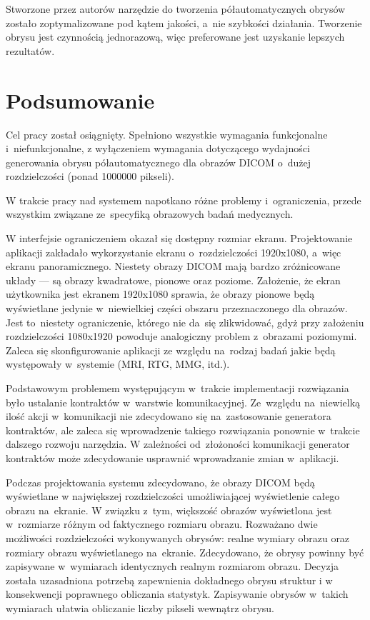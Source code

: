 \documentclass[a4paper,11pt,twoside,openright]{report}
\newcommand\blankpage{%
    \null
    \thispagestyle{empty}%
    \newpage}
\theoremstyle{definition}
\begin{document}
Stworzone przez autorów narzędzie do tworzenia półautomatycznych obrysów zostało zoptymalizowane
pod kątem jakości, a~nie szybkości działania. Tworzenie obrysu jest czynnością jednorazową, więc
preferowane jest uzyskanie lepszych rezultatów.

\afterpage{\blankpage}
\chapter {Podsumowanie}


Cel pracy został osiągnięty. Spełniono wszystkie wymagania funkcjonalne i~niefunkcjonalne,
z wyłączeniem wymagania dotyczącego wydajności generowania obrysu półautomatycznego
dla obrazów DICOM o~dużej rozdzielczości (ponad 1000000 pikseli).

W trakcie pracy nad systemem napotkano różne problemy i~ograniczenia, przede wszystkim
związane ze~specyfiką obrazowych badań medycznych.

W interfejsie ograniczeniem okazał się dostępny rozmiar ekranu. Projektowanie
aplikacji zakładało wykorzystanie ekranu o~rozdzielczości 1920x1080, a~więc ekranu
panoramicznego. Niestety obrazy DICOM mają bardzo zróżnicowane układy --- są obrazy
kwadratowe, pionowe oraz poziome. Założenie, że ekran użytkownika jest ekranem
1920x1080 sprawia, że obrazy pionowe będą wyświetlane jedynie w~niewielkiej
części obszaru przeznaczonego dla obrazów. Jest to~niestety ograniczenie, którego
nie da~się zlikwidować, gdyż przy założeniu rozdzielczości 1080x1920 powoduje
analogiczny problem z~obrazami poziomymi. Zaleca się skonfigurowanie aplikacji
ze względu na~rodzaj badań jakie będą występowały w~systemie (MRI, RTG, MMG, itd.).


Podstawowym problemem występującym w~trakcie implementacji rozwiązania było
ustalanie kontraktów w~warstwie komunikacyjnej. Ze~względu na~niewielką ilość
akcji w~komunikacji nie zdecydowano się na~zastosowanie generatora kontraktów,
ale zaleca się wprowadzenie takiego rozwiązania ponownie w~trakcie dalszego rozwoju narzędzia.
W zależności od~złożoności komunikacji generator kontraktów może zdecydowanie
usprawnić wprowadzanie zmian w~aplikacji.

Podczas projektowania systemu zdecydowano, że obrazy DICOM będą wyświetlane w
największej rozdzielczości umożliwiającej wyświetlenie całego obrazu na~ekranie.
W związku z~tym, większość obrazów wyświetlona jest w~rozmiarze różnym od
faktycznego rozmiaru obrazu. Rozważano dwie możliwości rozdzielczości wykonywanych
obrysów: realne wymiary obrazu oraz rozmiary obrazu wyświetlanego na~ekranie.
Zdecydowano, że obrysy powinny być zapisywane w~wymiarach identycznych realnym
rozmiarom obrazu. Decyzja została uzasadniona potrzebą zapewnienia dokładnego obrysu struktur i w konsekwencji poprawnego
obliczania statystyk. Zapisywanie obrysów w~takich wymiarach ułatwia obliczanie
liczby pikseli wewnątrz obrysu.
\end{document}
